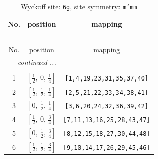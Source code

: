 \documentclass[fleqn,8pt]{jsarticle}
\begin{document}
\renewcommand{\arraystretch}{1.2}
\begin{longtable}{ccc}
\caption{Wyckoff site: {\tt 6g}, site symmetry: {\tt m'mm}}
 \\
 \hline \hline
No. & position & mapping \\ \hline \endfirsthead

\multicolumn{2}{l}{\tablename\ \thetable{}} \\
 \hline \hline
No. & position & mapping \\ \hline \endhead

 \hline \hline
\multicolumn{2}{r}{\footnotesize\it continued ...} \\ \endfoot

 \hline \hline
\multicolumn{2}{r}{} \\ \endlastfoot

1 & $\left[ \frac{1}{2},\, 0,\, \frac{1}{4} \right]$ & {\tt [1,4,19,23,31,35,37,40]} \\ \hline
2 & $\left[ \frac{1}{2},\, \frac{1}{2},\, \frac{1}{4} \right]$ & {\tt [2,5,21,22,33,34,38,41]} \\ \hline
3 & $\left[ 0,\, \frac{1}{2},\, \frac{1}{4} \right]$ & {\tt [3,6,20,24,32,36,39,42]} \\ \hline
4 & $\left[ \frac{1}{2},\, 0,\, \frac{3}{4} \right]$ & {\tt [7,11,13,16,25,28,43,47]} \\ \hline
5 & $\left[ 0,\, \frac{1}{2},\, \frac{3}{4} \right]$ & {\tt [8,12,15,18,27,30,44,48]} \\ \hline
6 & $\left[ \frac{1}{2},\, \frac{1}{2},\, \frac{3}{4} \right]$ & {\tt [9,10,14,17,26,29,45,46]} \\
\end{longtable}
\renewcommand{\arraystretch}{1.2}
\end{document}
